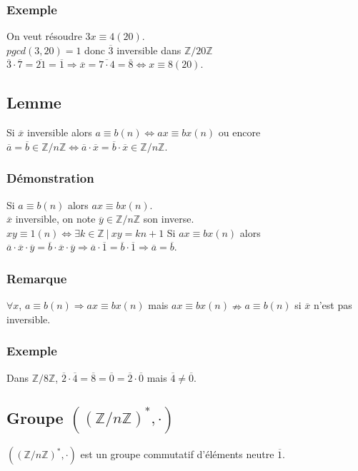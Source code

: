 \documentclass[a4paper,10pt]{book} %
\newcommand{\Z}{\mathbb{Z}}
\newcommand{\tq}{~|~}
\begin{document}
\subsubsection{Exemple}
On veut résoudre $3x\equiv 4(20)$.\\
$pgcd(3,20)=1$ donc $\overline{3}$ inversible dans $\Z/20\Z$ 
$\overline{3}\cdot \overline{7}=\overline{21}=\overline{1} \Rightarrow \overline{x}=\overline{7\cdot 4}=\overline{8} \Leftrightarrow x\equiv 8(20)$.

\subsection{Lemme}
Si $\overline{x}$ inversible alors $a\equiv b(n) \Leftrightarrow ax\equiv bx(n)$ ou encore $\overline{a} = \overline{b} \in \Z/n\Z \Leftrightarrow \overline{a}\cdot \overline{x} = \overline{b} \cdot \overline{x} \in \Z/n\Z$.

\subsubsection{Démonstration}
Si $a\equiv b(n)$ alors $ax\equiv bx(n)$.\\

$\overline{x}$ inversible, on note $\overline{y} \in \Z/n\Z$ son inverse.\\
$xy\equiv1(n)\Leftrightarrow \exists k\in \Z\tq xy=kn+1$
Si $ax\equiv bx(n)$ alors $\overline{a}\cdot \overline{x}\cdot \overline{y}=\overline{b}\cdot \overline{x}\cdot \overline{y}\Rightarrow \overline{a}\cdot \overline{1}=\overline{b}\cdot \overline{1}\Rightarrow \overline{a}=\overline{b}$.

\subsubsection{Remarque}
$\forall x$, $a\equiv b(n)\Rightarrow ax\equiv bx(n)$ mais $ax\equiv bx(n)\nRightarrow a\equiv b(n)$ si $\overline{x}$ n'est pas inversible.

\subsubsection{Exemple}
Dans $\Z/8\Z$, $\overline{2}\cdot \overline{4}=\overline{8}=\overline{0}=\overline{2}\cdot \overline{0}$
mais $\overline{4}\neq \overline{0}$.

\subsection{Groupe $((\Z/n\Z)^*,\cdot)$}
$((\Z/n\Z)^*,\cdot)$ est un groupe commutatif d’éléments neutre $\overline{1}$.
\end{document}
